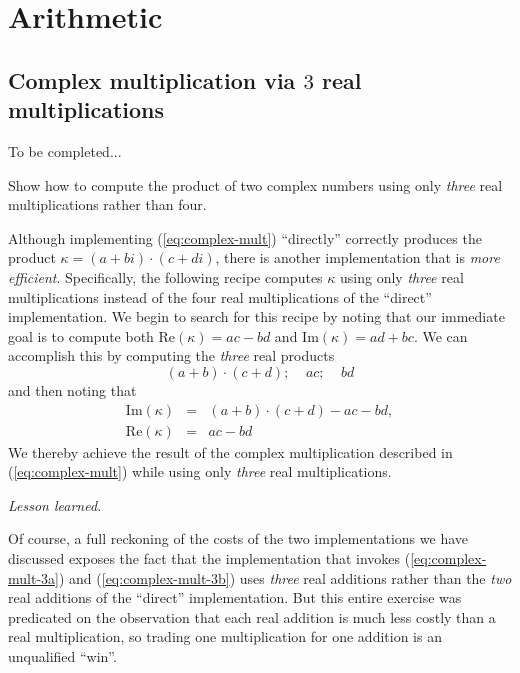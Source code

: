 
\section{Arithmetic}

\subsection{Complex
  multiplication via $3$ real multiplications}

To be completed...
\medskip

Show how to compute the product of two complex numbers using only {\em three}
real multiplications rather than four.
\medskip

Although implementing (\ref{eq:complex-mult}) ``directly'' correctly
produces the product $\kappa = (a+bi) \cdot (c+di)$, there is another
implementation that is {\em more efficient}.  Specifically, the
following recipe computes $\kappa$ using only {\em three} real
multiplications instead of the four real multiplications of the
``direct'' implementation.  We begin to search for this recipe by
noting that our immediate goal is to compute both Re$(\kappa) = ac-bd$
and Im$(\kappa) = ad+bc$.  We can accomplish this by computing the
{\em three} real products
\begin{equation}
\label{eq:complex-mult-3a}
(a+b) \cdot (c+d); \ \ \ \ \
ac;  \ \ \ \ \ bd
\end{equation}
and then noting that
\begin{equation}
\label{eq:complex-mult-3b}
\begin{array}{lcl}
\mbox{Im}(\kappa) & = & (a+b) \cdot (c+d) - ac -bd, \\
\mbox{Re}(\kappa) & = & ac -bd
\end{array}
\end{equation}
We thereby achieve the result of the complex multiplication described
in (\ref{eq:complex-mult}) while using only {\em three} real
multiplications.
\medskip

\noindent \textit{Lesson learned.}

Of course, a full reckoning of the costs of the two implementations we
have discussed exposes the fact that the implementation that invokes
(\ref{eq:complex-mult-3a}) and (\ref{eq:complex-mult-3b}) uses {\em
  three} real additions rather than the {\em two} real additions of
the ``direct'' implementation.  But this entire exercise was
predicated on the observation that each real addition is much less
costly than a real multiplication, so trading one multiplication for
one addition is an unqualified ``win''. 

